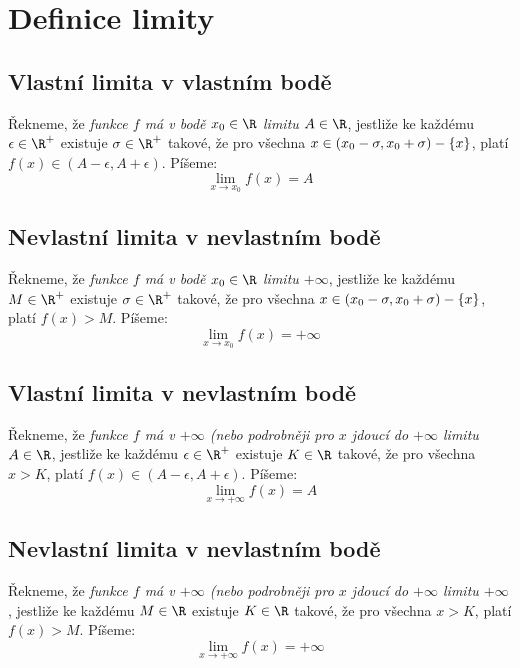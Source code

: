 
\BeginDoc{}
\def\posloup{$\zs{a_n}_{n=1}^{\infty}$}
\def\pos#1{\zs{#1}_{n=1}^{\infty}}
\def\li{\lim_{n\rightarrow\infty}}
\def\sup{{\rm sup\ }}
\def\sciwinfup{{\rm inf\ }}
\def\su{\sum_{n=1}^{\infty}}
\section{Definice limity}
\subsection{Vlastní limita v vlastním bodě}

\Def Řekneme, že \emph{funkce $f$ má v bodě $x_0\in\R$ limitu $A\in\R$},
jestliže ke každému $\epsilon \in \R^+$ existuje $\sigma \in\R^+$ takové, že pro všechna $x\in(x_0-\sigma,x_0+\sigma)-\left\{{x}\right\}$,
platí $f(x) \in (A-\epsilon,A+\epsilon)$. Píšeme:
$$\lim_{x\rightarrow x_0} f(x) = A$$

\subsection{Nevlastní limita v nevlastním bodě}

\Def Řekneme, že \emph{funkce $f$ má v bodě $x_0\in\R$ limitu $+\infty$},
jestliže ke každému $M \in \R^+$ existuje $\sigma \in\R^+$ takové, že pro všechna $x\in(x_0-\sigma,x_0+\sigma)-\left\{{x}\right\}$,
platí $f(x) > M$. Píšeme:
$$\lim_{x\rightarrow x_0} f(x) = +\infty$$

\subsection{Vlastní limita v nevlastním bodě}

\Def Řekneme, že \emph{funkce $f$ má v $+\infty$ (nebo podrobněji pro $x$ jdoucí do $+\infty$ limitu $A\in\R$},
jestliže ke každému $\epsilon \in \R^+$ existuje $K \in\R$ takové, že pro všechna $x>K$,
platí $f(x) \in (A-\epsilon,A+\epsilon)$. Píšeme:
$$\lim_{x\rightarrow +\infty} f(x) = A$$

\subsection{Nevlastní limita v nevlastním bodě}

\Def Řekneme, že \emph{funkce $f$ má v $+\infty$ (nebo podrobněji pro $x$ jdoucí do $+\infty$ limitu $+\infty$},
jestliže ke každému $M \in \R$ existuje $K \in\R$ takové, že pro všechna $x>K$,
platí $f(x) > M$. Píšeme:
$$\lim_{x\rightarrow +\infty} f(x) = +\infty$$

